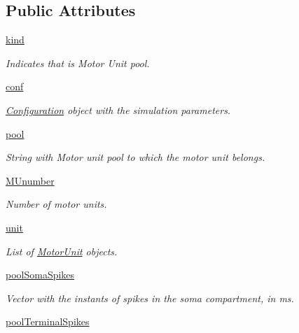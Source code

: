 \subsection*{Public Attributes}
\begin{DoxyCompactItemize}
\item 
\hyperlink{class_motor_unit_pool_1_1_motor_unit_pool_aeb57d0463ad56a16b166d00dc6079b95}{kind}
\begin{DoxyCompactList}\small\item\em Indicates that is Motor Unit pool. \end{DoxyCompactList}\item 
\hyperlink{class_motor_unit_pool_1_1_motor_unit_pool_a3b2ee8f3e5500bfdc8fa731a5cb7d622}{conf}
\begin{DoxyCompactList}\small\item\em \hyperlink{namespace_configuration}{Configuration} object with the simulation parameters. \end{DoxyCompactList}\item 
\hyperlink{class_motor_unit_pool_1_1_motor_unit_pool_a832364dc014aa8a1b2947abfe063f626}{pool}
\begin{DoxyCompactList}\small\item\em String with Motor unit pool to which the motor unit belongs. \end{DoxyCompactList}\item 
\hyperlink{class_motor_unit_pool_1_1_motor_unit_pool_aa5884530baaa20f46007805bc574407d}{M\-Unumber}
\begin{DoxyCompactList}\small\item\em Number of motor units. \end{DoxyCompactList}\item 
\hyperlink{class_motor_unit_pool_1_1_motor_unit_pool_a1b14c831606c27efae62f1468850393b}{unit}
\begin{DoxyCompactList}\small\item\em List of \hyperlink{namespace_motor_unit}{Motor\-Unit} objects. \end{DoxyCompactList}\item 
\hyperlink{class_motor_unit_pool_1_1_motor_unit_pool_a3790757a111061662ad0f98120b25e69}{pool\-Soma\-Spikes}
\begin{DoxyCompactList}\small\item\em Vector with the instants of spikes in the soma compartment, in ms. \end{DoxyCompactList}\item 
\hyperlink{class_motor_unit_pool_1_1_motor_unit_pool_a4f0b93df27eb6303fa1a3d49653d4fd3}{pool\-Terminal\-Spikes}

\end{DoxyCompactItemize}
